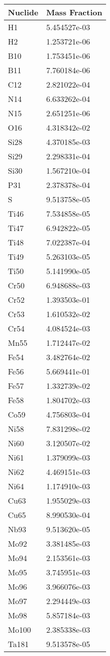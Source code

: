 \begin{centering}
\begin{longtable}[ht!]
\caption{Table showing the isotopic description of material EppDIagBox}
\label{table:material_EppDIagBox}
\end{longtable}\clearpage

\begin{longtable}[ht!]
{ p{} | p{} }
\hline
Nuclide & Mass Fraction\\
\hline
H1 & 5.454527e-03\\
H2 & 1.253721e-06\\
B10 & 1.753451e-06\\
B11 & 7.760184e-06\\
C12 & 2.821022e-04\\
N14 & 6.633262e-04\\
N15 & 2.651251e-06\\
O16 & 4.318342e-02\\
Si28 & 4.370185e-03\\
Si29 & 2.298331e-04\\
Si30 & 1.567210e-04\\
P31 & 2.378378e-04\\
S & 9.513758e-05\\
Ti46 & 7.534858e-05\\
Ti47 & 6.942822e-05\\
Ti48 & 7.022387e-04\\
Ti49 & 5.263103e-05\\
Ti50 & 5.141990e-05\\
Cr50 & 6.948688e-03\\
Cr52 & 1.393503e-01\\
Cr53 & 1.610532e-02\\
Cr54 & 4.084524e-03\\
Mn55 & 1.712447e-02\\
Fe54 & 3.482764e-02\\
Fe56 & 5.669441e-01\\
Fe57 & 1.332739e-02\\
Fe58 & 1.804702e-03\\
Co59 & 4.756803e-04\\
Ni58 & 7.831298e-02\\
Ni60 & 3.120507e-02\\
Ni61 & 1.379099e-03\\
Ni62 & 4.469151e-03\\
Ni64 & 1.174910e-03\\
Cu63 & 1.955029e-03\\
Cu65 & 8.990530e-04\\
Nb93 & 9.513620e-05\\
Mo92 & 3.381485e-03\\
Mo94 & 2.153561e-03\\
Mo95 & 3.745951e-03\\
Mo96 & 3.966076e-03\\
Mo97 & 2.294449e-03\\
Mo98 & 5.857184e-03\\
Mo100 & 2.385338e-03\\
Ta181 & 9.513578e-05\\


\end{longtable}
\end{centering}
